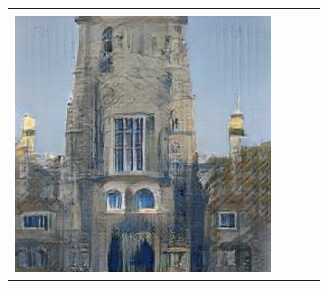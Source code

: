 \documentclass{article}
\begin{document}
\begin{figure}[h!]
\begin{tabular}{c  c c  c }
\begin{subfigure}[h!]{0.25\textwidth}
        \\
        \includegraphics[scale=0.3]{images/77noartifact.jpeg}
    \end{subfigure}
    \end{tabular}
\end{figure}
\end{document}
